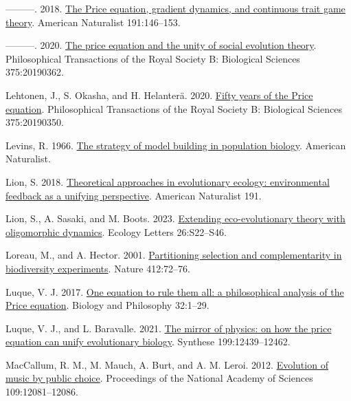 \documentclass[
]{article}
\newlength{\cslhangindent}
\newenvironment{CSLReferences}[2] %
 {\begin{list}{}{%
  \setlength{\itemindent}{0pt}
  \setlength{\leftmargin}{0pt}
  \setlength{\parsep}{0pt}
  \ifodd #1
   \setlength{\leftmargin}{\cslhangindent}
   \setlength{\itemindent}{-1\cslhangindent}
  \fi
  \setlength{\itemsep}{#2\baselineskip}}}
 {\end{list}}
\begin{document}
\begin{CSLReferences}{1}{0}
---------. 2018. \href{https://doi.org/10.1086/694891}{{The Price
equation, gradient dynamics, and continuous trait game theory}}.
American Naturalist 191:146--153.

---------. 2020. \href{https://doi.org/10.1098/rstb.2019.0362}{The price
equation and the unity of social evolution theory}. Philosophical
Transactions of the Royal Society B: Biological Sciences 375:20190362.

Lehtonen, J., S. Okasha, and H. Helanterä. 2020.
\href{https://doi.org/10.1098/rstb.2019.0350}{{Fifty years of the Price
equation}}. Philosophical Transactions of the Royal Society B:
Biological Sciences 375:20190350.

Levins, R. 1966. \href{https://doi.org/10.2307/27836590}{The strategy of
model building in population biology}. American Naturalist.

Lion, S. 2018. \href{https://doi.org/10.1086/694865}{{Theoretical
approaches in evolutionary ecology: environmental feedback as a unifying
perspective}}. American Naturalist 191.

Lion, S., A. Sasaki, and M. Boots. 2023.
\href{https://doi.org/10.1111/ele.14183}{Extending eco-evolutionary
theory with oligomorphic dynamics}. Ecology Letters 26:S22--S46.

Loreau, M., and A. Hector. 2001.
\href{https://doi.org/10.1038/35083573}{{Partitioning selection and
complementarity in biodiversity experiments}}. Nature 412:72--76.

Luque, V. J. 2017. \href{https://doi.org/10.1007/s10539-016-9538-y}{{One
equation to rule them all: a philosophical analysis of the Price
equation}}. Biology and Philosophy 32:1--29.

Luque, V. J., and L. Baravalle. 2021.
\href{https://doi.org/10.1007/s11229-021-03339-6}{{The mirror of
physics: on how the price equation can unify evolutionary biology}}.
Synthese 199:12439--12462.

MacCallum, R. M., M. Mauch, A. Burt, and A. M. Leroi. 2012.
\href{https://doi.org/10.5061/dryad.h0228}{{Evolution of music by public
choice}}. Proceedings of the National Academy of Sciences
109:12081--12086.


\end{CSLReferences}
\end{document}
